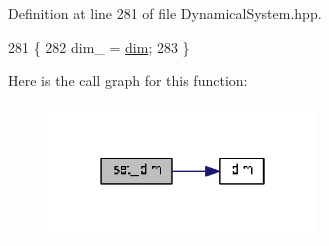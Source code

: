 Definition at line 281 of file Dynamical\+System.\+hpp.


\begin{DoxyCode}
281                                \{
282     dim\_ = \hyperlink{group__DynamicalSystems_ga6f628f7f4ed9d77bf69f5b8560b98f18}{dim};
283   \}
\end{DoxyCode}


Here is the call graph for this function\+:
\nopagebreak
\begin{figure}[H]
\begin{center}
\leavevmode
\includegraphics[width=202pt]{group__DynamicalSystems_ga9000562e645149d75717458a97db6ff5_cgraph}
\end{center}
\end{figure}


